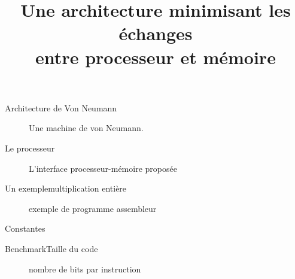\documentclass[slidetop,11pt,table]{beamer}
\title{Une architecture minimisant les échanges\\ entre processeur et mémoire}
\date{}
\begin{document}
\frame{\titlepage}


\begin{frame}{Architecture de Von Neumann}
  \begin{figure}[b]
    \begin{center}
      \figVonNeumann
    \end{center}
    \caption{Une machine de von Neumann.}
    \label{fig:mvn} 
  \end{figure}
\end{frame}

\begin{frame}{Le processeur}
  \begin{figure}[b]
    \begin{center}
      \proco
    \end{center}
    \caption{L'interface processeur-mémoire proposée}
    \label{fig:overview}
  \end{figure}
\end{frame}

\begin{frame}{Un exemple}{multiplication entière}
  \begin{figure}
    {\tiny \tt \progex}
    \caption{exemple de programme assembleur}
  \end{figure}
\end{frame}

\begin{frame}{Constantes}
  \begin{table}[t]
  \centering
  \caption{Encodage \emph{prefix-free} des différentes constantes  \label{tab:constantes}}
  {\tiny \prefree}
\end{table}
\end{frame}

\begin{frame}{Benchmark}{Taille du code}
  \begin{figure}
    \centering
    \caption{nombre de bits par instruction}
  \end{figure}
\end{frame}
\end{document}
